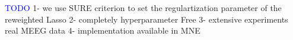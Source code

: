 \textcolor{blue}{TODO}
1- we use SURE criterion to set the regulartization parameter of the reweighted Lasso
2- completely hyperparameter Free
3- extensive experiments real MEEG data
4- implementation available in MNE
